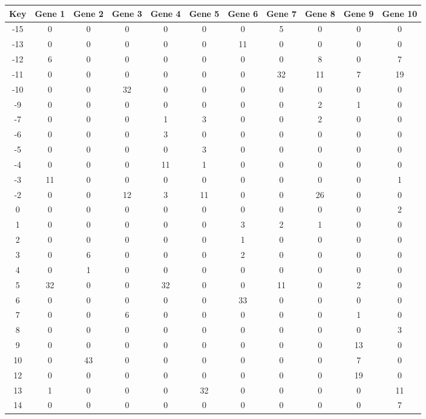 \begin{tabular}{|c|c|c|c|c|c|c|c|c|c|c|}
\hline
Key & Gene 1 & Gene 2 & Gene 3 & Gene 4 & Gene 5 & Gene 6 & Gene 7 & Gene 8 & Gene 9 & Gene 10 \\
\hline
-15 & 0 & 0 & 0 & 0 & 0 & 0 & 5 & 0 & 0 & 0 \\
-13 & 0 & 0 & 0 & 0 & 0 & 11 & 0 & 0 & 0 & 0 \\
-12 & 6 & 0 & 0 & 0 & 0 & 0 & 0 & 8 & 0 & 7 \\
-11 & 0 & 0 & 0 & 0 & 0 & 0 & 32 & 11 & 7 & 19 \\
-10 & 0 & 0 & 32 & 0 & 0 & 0 & 0 & 0 & 0 & 0 \\
-9 & 0 & 0 & 0 & 0 & 0 & 0 & 0 & 2 & 1 & 0 \\
-7 & 0 & 0 & 0 & 1 & 3 & 0 & 0 & 2 & 0 & 0 \\
-6 & 0 & 0 & 0 & 3 & 0 & 0 & 0 & 0 & 0 & 0 \\
-5 & 0 & 0 & 0 & 0 & 3 & 0 & 0 & 0 & 0 & 0 \\
-4 & 0 & 0 & 0 & 11 & 1 & 0 & 0 & 0 & 0 & 0 \\
-3 & 11 & 0 & 0 & 0 & 0 & 0 & 0 & 0 & 0 & 1 \\
-2 & 0 & 0 & 12 & 3 & 11 & 0 & 0 & 26 & 0 & 0 \\
0 & 0 & 0 & 0 & 0 & 0 & 0 & 0 & 0 & 0 & 2 \\
1 & 0 & 0 & 0 & 0 & 0 & 3 & 2 & 1 & 0 & 0 \\
2 & 0 & 0 & 0 & 0 & 0 & 1 & 0 & 0 & 0 & 0 \\
3 & 0 & 6 & 0 & 0 & 0 & 2 & 0 & 0 & 0 & 0 \\
4 & 0 & 1 & 0 & 0 & 0 & 0 & 0 & 0 & 0 & 0 \\
5 & 32 & 0 & 0 & 32 & 0 & 0 & 11 & 0 & 2 & 0 \\
6 & 0 & 0 & 0 & 0 & 0 & 33 & 0 & 0 & 0 & 0 \\
7 & 0 & 0 & 6 & 0 & 0 & 0 & 0 & 0 & 1 & 0 \\
8 & 0 & 0 & 0 & 0 & 0 & 0 & 0 & 0 & 0 & 3 \\
9 & 0 & 0 & 0 & 0 & 0 & 0 & 0 & 0 & 13 & 0 \\
10 & 0 & 43 & 0 & 0 & 0 & 0 & 0 & 0 & 7 & 0 \\
12 & 0 & 0 & 0 & 0 & 0 & 0 & 0 & 0 & 19 & 0 \\
13 & 1 & 0 & 0 & 0 & 32 & 0 & 0 & 0 & 0 & 11 \\
14 & 0 & 0 & 0 & 0 & 0 & 0 & 0 & 0 & 0 & 7 \\
\hline
\end{tabular}